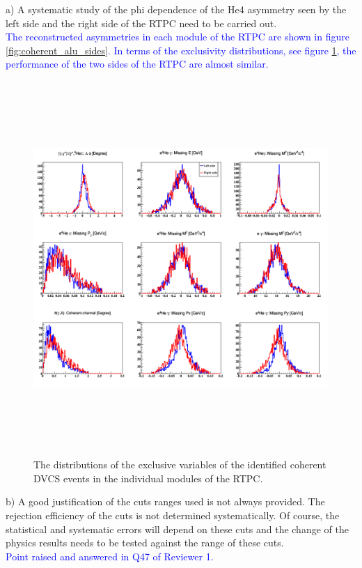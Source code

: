  a) A systematic study of the phi dependence of the He4 asymmetry seen by the 
 left side and the right side of the RTPC need to be carried out.\\
\textcolor{blue}{ The reconstructed asymmetries in each module of the RTPC are 
shown in figure \ref{fig:coherent_alu_sides}. In terms of the exclusivity 
distributions, see figure \ref{fig:sides_rtpc_exclusivity}, the performance of 
the two sides of the RTPC are almost similar.}\\

\begin{figure}[h!]
   \centering 
\includegraphics[height=14.2cm]{fig/all_coh_exc_cuts_final_sides.png} 
\caption{The distributions of the exclusive variables of the identified 
coherent DVCS events in the individual modules of the RTPC.}                                    
\label{fig:sides_rtpc_exclusivity}                                   
\end{figure}


 b) A good justification of the cuts ranges used is not always provided. The 
rejection efficiency of the cuts is not determined systematically. Of course, 
the statistical and systematic errors will depend on these cuts and the change 
of the physics results needs to be tested against the range of these cuts. \\
\textcolor{blue}{ Point raised and answered in Q47 of Reviewer 1. }\\

